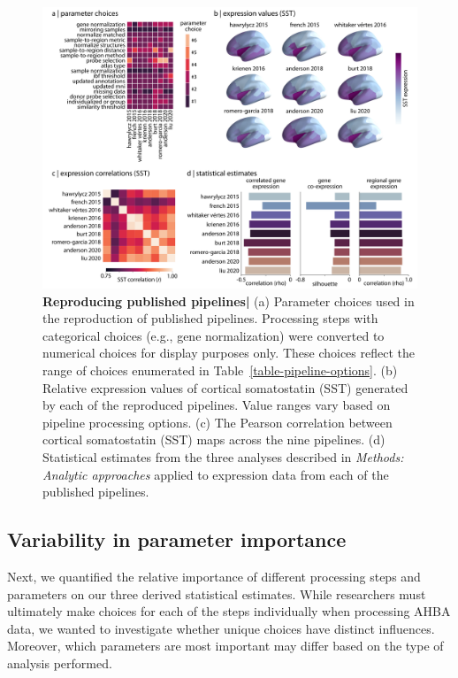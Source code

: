 \documentclass[12pt,aps,pra,reprint,showkeys]{revtex4-1}
\begin{document}
\begin{figure}[htp]
  \begin{center}
    \centerline{\includegraphics[width=\textwidth]{published_pipelines.png}}
    \caption{
      \textbf{Reproducing published pipelines|}
      (a) Parameter choices used in the reproduction of published pipelines.
      Processing steps with categorical choices (e.g., gene normalization) were converted to numerical choices for display purposes only.
      These choices reflect the range of choices enumerated in Table~\ref{table-pipeline-options}.
      (b) Relative expression values of cortical somatostatin (SST) generated by each of the reproduced pipelines.
      Value ranges vary based on pipeline processing options.
      (c) The Pearson correlation between cortical somatostatin (SST) maps across the nine pipelines.
      (d) Statistical estimates from the three analyses described in \emph{Methods: Analytic approaches} applied to expression data from each of the published pipelines.
      }
    \label{figure-published-pipelines}
  \end{center}
\end{figure}

\subsection*{Variability in parameter importance}

Next, we quantified the relative importance of different processing steps and parameters on our three derived statistical estimates.
While researchers must ultimately make choices for each of the steps individually when processing AHBA data, we wanted to investigate whether unique choices have distinct influences.
Moreover, which parameters are most important may differ based on the type of analysis performed.
\end{document}
